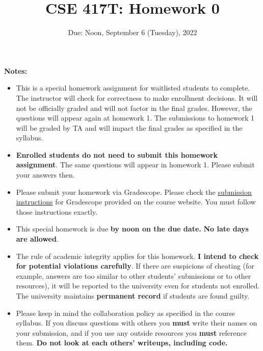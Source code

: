 \documentclass[11pt]{article}
\begin{document}
\title{CSE 417T: Homework 0}
\date{Due: Noon, September 6 (Tuesday), 2022}

\maketitle

\noindent \textbf{Notes: } 
\begin{itemize}

\item This is a special homework assignment for waitlisted students to complete. 
The instructor will check for correctness to make enrollment decisions.
It will not be officially graded and will not factor in the final grades. 
However, the questions will appear again at homework 1. 
The submissions to homework 1 will be graded by TA and will impact the final grades as specified in the syllabus.

\item \textbf{Enrolled students do not need to submit this homework assignment}. 
The same questions will appear in homework 1. Please submit your answers then.

\item Please submit your homework via Gradescope. 
  Please check the \href{http://chienjuho.com/courses/cse417t/hw_instructions.html}{\underline{submission instructions}} for Gradescope
  provided on the course website. You must follow those instructions exactly.

\item This special homework is due \textbf{by noon on the due date.} 
  \textbf{No late days are allowed}.

\item The rule of academic integrity applies for this homework. \textbf{I intend to check for potential violations carefully}. If there are suspicions of cheating (for example, answers are too similar to other students' submissions or to other resources), it will be reported to the university even for students not enrolled.
The university maintains \textbf{permanent record} if students are found guilty.

\item Please keep in mind the collaboration policy as specified in the
  course syllabus. If you discuss questions with 
others you \textbf{must} write their names on your submission, and if
you use any outside resources you \textbf{must} reference
them. \textbf{Do not look at each others' writeups, including code.}


\end{itemize}
\end{document}
